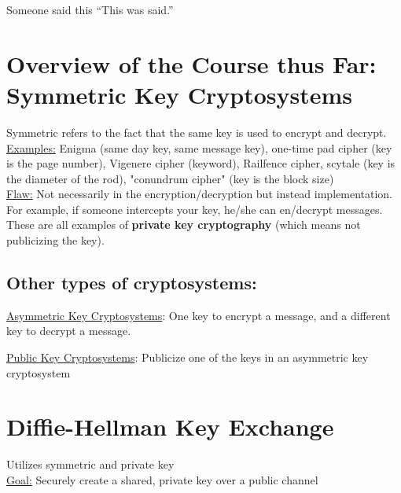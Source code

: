\begin{chapquote}{Someone said this}
``This was said.''
\end{chapquote}

\section{Overview of the Course thus Far: Symmetric Key Cryptosystems}
Symmetric refers to the fact that the same key is used to encrypt and decrypt. \\

\underline{Examples:} Enigma (same day key, same message key), one-time pad cipher (key is the page number), Vigenere cipher (keyword), Railfence cipher, scytale (key is the diameter of the rod), "conundrum cipher" (key is the block size) \\ 
\underline{Flaw:} Not necessarily in the encryption/decryption but instead implementation. \\

For example, if someone intercepts your key, he/she can en/decrypt messages. \\

These are all examples of \textbf{private key cryptography} (which means not publicizing the key).\\

\subsection{Other types of cryptosystems:}

\underline{Asymmetric Key Cryptosystems}: One key to encrypt a message, and a different key to decrypt a message.

\underline{Public Key Cryptosystems}: Publicize one of the keys in an asymmetric key cryptosystem \\

\section{Diffie-Hellman Key Exchange} 
Utilizes symmetric and private key \\

\underline{Goal:} Securely create a shared, private key over a public channel \\

